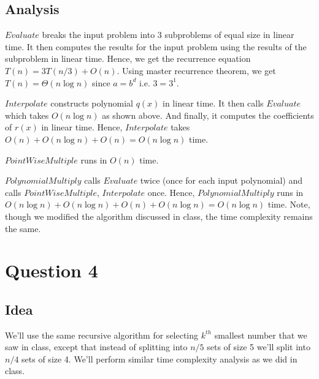 \documentclass{article}
\begin{document}
    \subsection*{Analysis}
    $Evaluate$ breaks the input problem into 3 subproblems of equal size in linear time. It then computes the results for the input problem using the results of the subproblem in linear time. Hence, we get the recurrence equation $T(n) = 3T(n/3) + O(n)$. Using master recurrence theorem, we get $T(n) = \Theta(n \log n)$ since $a = b^d$ i.e. $3 = 3^1$.

    $Interpolate$ constructs polynomial $q(x)$ in linear time. It then calls $Evaluate$ which takes $O(n \log n)$ as shown above. And finally, it computes the coefficients of $r(x)$ in linear time. Hence, $Interpolate$ takes $O(n) + O(n \log n) + O(n) = O(n \log n)$ time.

    $PointWiseMultiple$ runs in $O(n)$ time.

    $PolynomialMultiply$ calls $Evaluate$ twice (once for each input polynomial) and calls $PointWiseMultiple$, $Interpolate$ once. Hence, $PolynomialMultiply$ runs in $O(n \log n) + O(n \log n) + O(n) + O(n \log n) = O(n \log n)$ time. Note, though we modified the algorithm discussed in class, the time complexity remains the same.

    \section*{Question 4}

    \subsection*{Idea}
    We'll use the same recursive algorithm for selecting $k^{th}$ smallest number that we saw in class, except that instead of splitting into $n/5$ sets of size 5 we'll split into $n/4$ sets of size 4. We'll perform similar time complexity analysis as we did in class.
    
\end{document}

